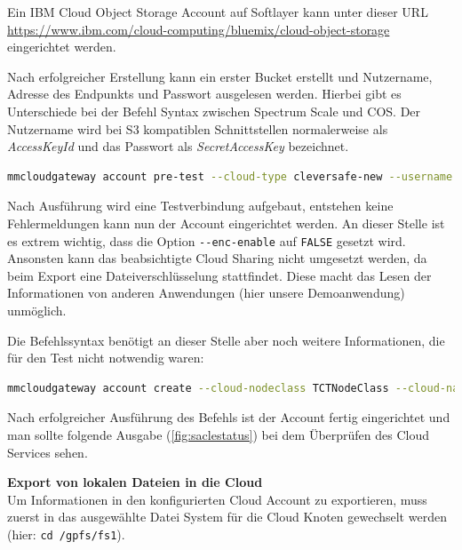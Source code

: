 Ein IBM Cloud Object Storage Account auf Softlayer kann unter dieser URL \url{https://www.ibm.com/cloud-computing/bluemix/cloud-object-storage} eingerichtet werden. 

Nach erfolgreicher Erstellung kann ein erster Bucket erstellt und Nutzername, Adresse des Endpunkts und Passwort ausgelesen werden. Hierbei gibt es Unterschiede bei der Befehl Syntax zwischen Spectrum Scale und \ac{COS}. 
Der Nutzername wird bei S3 kompatiblen Schnittstellen normalerweise als \textit{AccessKeyId} und das Passwort als \textit{SecretAccessKey} bezeichnet.\\

\begin{lstlisting}[language=bash, caption=Vortest des Cloud Sharing Accounts]
mmcloudgateway account pre-test --cloud-type cleversafe-new --username "<username>" --pwd-file <path/file/your/secretAccessKey> --cloud-url <cos/endpoint>
\end{lstlisting}

Nach Ausführung wird eine Testverbindung aufgebaut, entstehen keine Fehlermeldungen kann nun der Account eingerichtet werden. An dieser Stelle ist es extrem wichtig, dass die Option \lstinline|--enc-enable| auf \lstinline|FALSE| gesetzt wird. Ansonsten kann das beabsichtigte Cloud Sharing nicht umgesetzt werden, da beim Export eine Dateiverschlüsselung stattfindet. Diese macht das Lesen der Informationen von anderen Anwendungen (hier unsere Demoanwendung) unmöglich.

Die Befehlssyntax benötigt an dieser Stelle aber noch weitere Informationen, die für den Test nicht notwendig waren:\\

\begin{lstlisting}[language=bash, caption=Einrichtung des Cloud Sharing Accounts]
mmcloudgateway account create --cloud-nodeclass TCTNodeClass --cloud-name mcstore --cloud-type cleversafe-new --username "<username>" --pwd-file <path/file/your/secretAccessKey> --enable TRUE --cloud-url <cos/endpoint> --enc-enable FALSE
\end{lstlisting}

Nach erfolgreicher Ausführung des Befehls ist der Account fertig eingerichtet und man sollte folgende Ausgabe (\autoref{fig:saclestatus}) bei dem Überprüfen des Cloud Services sehen.

\textbf{Export von lokalen Dateien in die Cloud}\\
Um Informationen in den konfigurierten Cloud Account zu exportieren, muss zuerst in das ausgewählte Datei System für die Cloud Knoten gewechselt werden (hier: \lstinline|cd /gpfs/fs1|).


